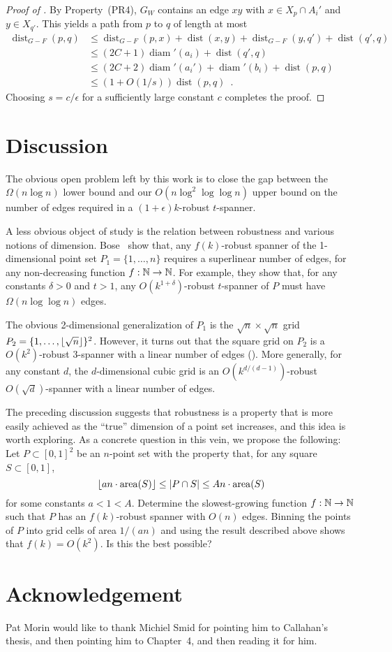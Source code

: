 \documentclass{patmorin}
\DeclareMathOperator{\diam}{diam}
\DeclareMathOperator{\dist}{dist}
\DeclareMathOperator{\ar}{area}
\begin{document}
\begin{proof}[Proof of ]
  By Property~(PR4), $G_W$ contains an edge $xy$ with $x\in X_p\cap A_i'$ and $y\in X_{q'}$.  
   This yields a path from $p$ to $q$ of length at most
  \begin{align*}
    \dist_{G-F}(p,q) & \le \dist_{G-F}(p,x) + \dist(x,y) + \dist_{G-F}(y,q') + \dist(q',q) \\
      & \le (2C+1)\diam'(a_i) + \dist(q',q) \\
      & \le (2C+2)\diam'(a_i') + \diam'(b_i) + \dist(p,q) \\
      & \le (1+O(1/s))\dist(p,q) \enspace . 
  \end{align*}
  Choosing $s = c/\epsilon$ for a sufficiently large constant $c$
  completes the proof.
\end{proof}

\section{Discussion}

The obvious open problem left by this work is to close the gap between the
$\Omega(n\log n)$ lower bound and our $O(n\log^2\log\log n)$ upper bound
on the number of edges required in a $(1+\epsilon)k$-robust $t$-spanner.

A less obvious object of study is the relation between robustness and
various notions of dimension.  Bose \etal\ show that, any $f(k)$-robust
spanner of the 1-dimensional point set $P_1=\{1,\ldots,n\}$ requires a
superlinear number of edges, for any non-decreasing function $f:\mathbb{N}\to\mathbb{N}$.
For example, they show that, for any constants $\delta>0$ and $t>1$, any
$O(k^{1+\delta})$-robust $t$-spanner of $P$ must have $\Omega(n\log\log
n)$ edges.

The obvious 2-dimensional generalization of $P_1$ is the
$\sqrt{n}\times\sqrt{n}$ grid $P_2=\{1,\ldots,{\lfloor \sqrt{n} \rfloor}\}^2$.
However, it turns out that the square grid on $P_2$ is a
$O(k^2)$-robust $3$-spanner with a linear number of edges
(\cite[Section~4]{bose.dujmovic.ea:robust}).  More generally, for any
constant $d$, the $d$-dimensional cubic grid is an $O(k^{d/(d-1)})$-robust
$O(\sqrt{d})$-spanner with a linear number of edges.

The preceding discussion suggests that robustness is a property that is
more easily achieved as the ``true'' dimension of a point set increases,
and this idea is worth exploring.  As a concrete question in this vein,
we propose the following:  Let $P\subset[0,1]^2$ be an $n$-point set
with the property that, for any square $S\subset [0,1]$,
\[
    \floor{an\cdot\ar(S)} \le |P\cap S| \le An\cdot\ar(S)
\]
for some constants $a < 1 < A$.  Determine the slowest-growing function
$f:\mathbb{N}\to\mathbb{N}$ such that $P$ has an $f(k)$-robust spanner with $O(n)$
edges.  Binning the points of $P$ into grid cells of area $1/(an)$ and
using the result described above shows that $f(k)=O(k^2)$.  Is this the
best possible?




\section*{Acknowledgement}

Pat Morin would like to thank Michiel Smid for pointing him to Callahan's thesis, and then pointing him to Chapter~4, and then reading it for him.




\end{document}
